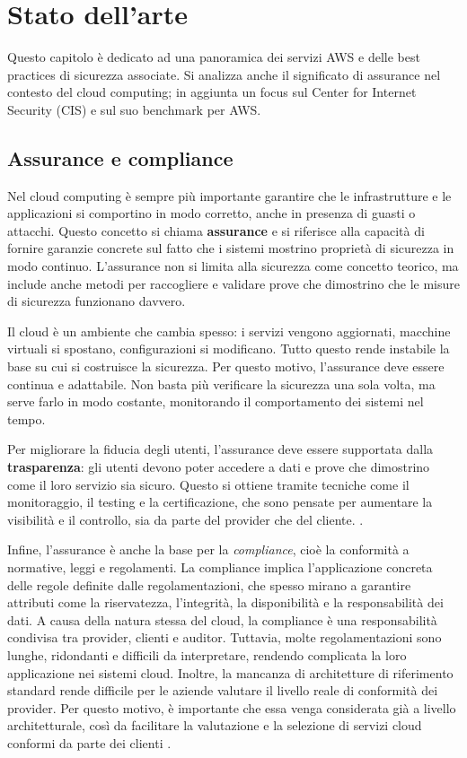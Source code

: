 \chapter{Stato dell'arte}
\label{cap:stato_arte}

Questo capitolo è dedicato ad una panoramica dei servizi AWS e delle best practices di sicurezza associate. Si analizza anche il significato di assurance nel contesto del cloud computing; in aggiunta un focus sul Center for Internet Security (CIS) e sul suo benchmark per AWS.

\section{Assurance e compliance}
\label{sec:assurance}

Nel cloud computing è sempre più importante garantire che le infrastrutture e le applicazioni si comportino in modo corretto, anche in presenza di guasti o attacchi. Questo concetto si chiama \textbf{assurance} e si riferisce alla capacità di fornire garanzie concrete sul fatto che i sistemi mostrino proprietà di sicurezza in modo continuo. L'assurance non si limita alla sicurezza come concetto teorico, ma include anche metodi per raccogliere e validare prove che dimostrino che le misure di sicurezza funzionano davvero.

Il cloud è un ambiente che cambia spesso: i servizi vengono aggiornati, macchine virtuali si spostano, configurazioni si modificano. Tutto questo rende instabile la base su cui si costruisce la sicurezza. Per questo motivo, l'assurance deve essere continua e adattabile. Non basta più verificare la sicurezza una sola volta, ma serve farlo in modo costante, monitorando il comportamento dei sistemi nel tempo.

Per migliorare la fiducia degli utenti, l'assurance deve essere supportata dalla \textbf{trasparenza}: gli utenti devono poter accedere a dati e prove che dimostrino come il loro servizio sia sicuro. Questo si ottiene tramite tecniche come il monitoraggio, il testing e la certificazione, che sono pensate per aumentare la visibilità e il controllo, sia da parte del provider che del cliente. \cite{ardagna2015security}.

Infine, l'assurance è anche la base per la \textit{compliance}, cioè la conformità a normative, leggi e regolamenti. La compliance implica l'applicazione concreta delle regole definite dalle regolamentazioni, che spesso mirano a garantire attributi come la riservatezza, l'integrità, la disponibilità e la responsabilità dei dati. A causa della natura stessa del cloud, la compliance è una responsabilità condivisa tra provider, clienti e auditor. Tuttavia, molte regolamentazioni sono lunghe, ridondanti e difficili da interpretare, rendendo complicata la loro applicazione nei sistemi cloud. Inoltre, la mancanza di architetture di riferimento standard rende difficile per le aziende valutare il livello reale di conformità dei provider. Per questo motivo, è importante che essa venga considerata già a livello architetturale, così da facilitare la valutazione e la selezione di servizi cloud conformi da parte dei clienti \cite{yimam2016survey}.


